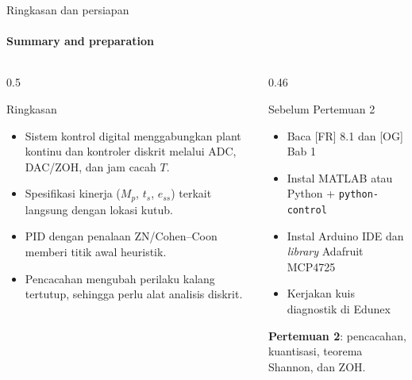 \documentclass[aspectratio=169,10pt]{beamer}
\begin{document}
\begin{frame}{Ringkasan dan persiapan}
	\framesubtitle{Summary and preparation}
	\begin{columns}[T]
		\begin{column}{0.5\textwidth}
			\begin{block}{Ringkasan}
				\small
				\begin{itemize}
					\item Sistem kontrol digital menggabungkan plant kontinu dan kontroler diskrit melalui ADC, DAC/ZOH, dan jam cacah $T$.
					\item Spesifikasi kinerja ($M_p$, $t_s$, $e_{ss}$) terkait langsung dengan lokasi kutub.
					\item PID dengan penalaan ZN/Cohen--Coon memberi titik awal heuristik.
					\item Pencacahan mengubah perilaku kalang tertutup, sehingga perlu alat analisis diskrit.
				\end{itemize}
			\end{block}
		\end{column}
		\begin{column}{0.46\textwidth}
			\begin{exampleblock}{Sebelum Pertemuan 2}
				\small
				\begin{itemize}
					\item Baca [FR] 8.1 dan [OG] Bab 1
					\item Instal MATLAB atau Python + \texttt{python-control}
					\item Instal Arduino IDE dan \textit{library} Adafruit MCP4725
					\item Kerjakan kuis diagnostik di Edunex
				\end{itemize}
			\end{exampleblock}
			\vspace{0.15cm}
			{\small\textbf{Pertemuan 2}: pencacahan, kuantisasi, teorema Shannon, dan ZOH.}
		\end{column}
	\end{columns}
\end{frame}
\end{document}
